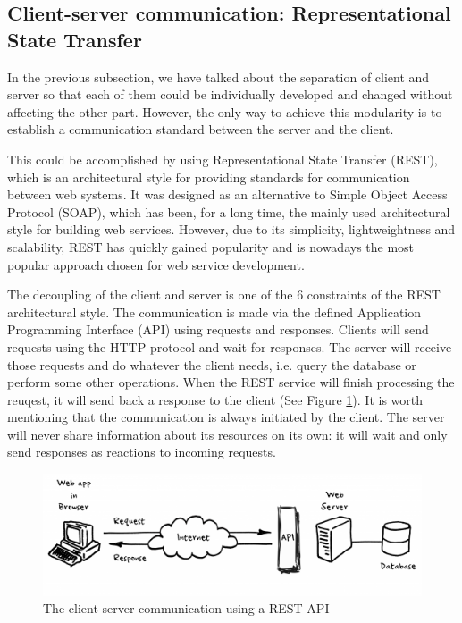 \subsection{Client-server communication: Representational State Transfer}
\label{subsection:rest}

In the previous subsection, we have talked about the separation of client and server so that each of them could be individually developed and changed without affecting the other part. However, the only way to achieve this modularity is to establish a communication standard between the server and the client.

This could be accomplished by using Representational State Transfer (REST), which is an architectural style for providing standards for communication between web systems. It was designed as an alternative to Simple Object Access Protocol (SOAP), which has been, for a long time, the mainly used architectural style for building web services. However, due to its simplicity, lightweightness and scalability, REST has quickly gained popularity and is nowadays the most popular approach chosen for web service development.

The decoupling of the client and server is one of the 6 constraints of the REST architectural style. The communication is made via the defined Application Programming Interface (API) using requests and responses. Clients will send requests using the HTTP protocol and wait for responses. The server will receive those requests and do whatever the client needs, i.e. query the database or perform some other operations. When the REST service will finish processing the reuqest, it will send back a response to the client (See Figure \ref{rest}). It is worth mentioning that the communication is always initiated by the client. The server will never share information about its resources on its own: it will wait and only send responses as reactions to incoming requests.

\begin{figure}[H]
  \centering
  \includegraphics[width=5in]{images/rest}
  \caption{The client-server communication using a REST API \cite{rest}}
  \label{rest}
\end{figure}

